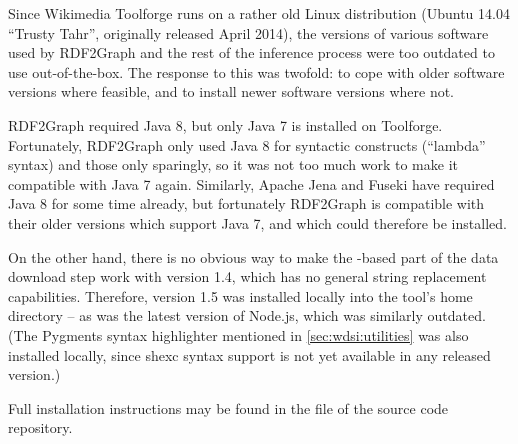 Since Wikimedia Toolforge runs on a rather old Linux distribution
(Ubuntu 14.04 “Trusty Tahr”, originally released April 2014),
the versions of various software used by \gls{RDF2Graph} and the rest of the inference process
were too outdated to use out-of-the-box.
The response to this was twofold:
to cope with older software versions where feasible,
and to install newer software versions where not.

\Gls{RDF2Graph} required Java 8,
but only Java 7 is installed on Toolforge.
Fortunately, \gls{RDF2Graph} only used Java 8 for syntactic constructs (“lambda” syntax)
and those only sparingly, so it was not too much work to make it compatible with Java 7 again.
Similarly, Apache Jena and Fuseki have required Java 8 for some time already,
but fortunately \gls{RDF2Graph} is compatible with their older versions which support Java 7,
and which could therefore be installed.

On the other hand, there is no obvious way to make the -based part of the data download step
work with  version 1.4, which has no general string replacement capabilities.
Therefore,  version 1.5 was installed locally into the tool’s home directory –
as was the latest version of \gls{Node.js}, which was similarly outdated.
(The Pygments syntax highlighter mentioned in \cref{sec:wdsi:utilities} was also installed locally,
since \gls{shexc} syntax support is not yet available in any released version.)

Full installation instructions may be found in the  file of the source code repository.
